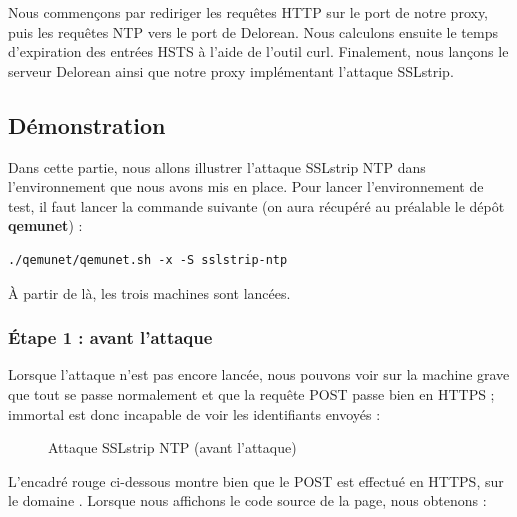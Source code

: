 Nous commençons par rediriger les requêtes HTTP sur le port de notre proxy, puis les requêtes NTP vers le port de Delorean. Nous calculons ensuite le temps d'expiration des entrées HSTS à l'aide de l'outil curl. Finalement, nous lançons le serveur Delorean ainsi que notre proxy implémentant l'attaque SSLstrip.

\subsection{Démonstration}

Dans cette partie, nous allons illustrer l'attaque SSLstrip NTP dans l'environnement que nous avons mis en place. Pour lancer l'environnement de test, il faut lancer la commande suivante (on aura récupéré au préalable le dépôt \textbf{qemunet}) :

\begin{verbatim}
./qemunet/qemunet.sh -x -S sslstrip-ntp
\end{verbatim}

À partir de là, les trois machines sont lancées.

\subsubsection{Étape 1 : avant l'attaque}

Lorsque l'attaque n'est pas encore lancée, nous pouvons voir sur la machine grave que tout se passe normalement et que la requête POST passe bien en HTTPS ; immortal est donc incapable de voir les identifiants envoyés :

\begin{figure}[H]
  \caption{Attaque SSLstrip NTP (avant l'attaque)}
\end{figure}


L'encadré rouge ci-dessous montre bien que le POST est effectué en HTTPS, sur le domaine . Lorsque nous affichons le code source de la page, nous obtenons :

